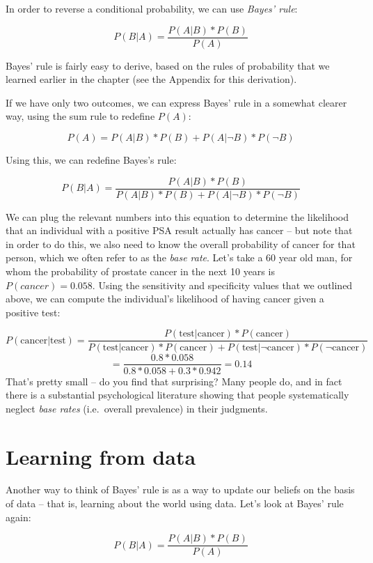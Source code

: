 \documentclass[
  12pt,
]{book}
\begin{document}
In order to reverse a conditional probability, we can use \emph{Bayes' rule}:

\[
P(B|A) = \frac{P(A|B)*P(B)}{P(A)}
\]

Bayes' rule is fairly easy to derive, based on the rules of probability that we learned earlier in the chapter (see the Appendix for this derivation).

If we have only two outcomes, we can express Bayes' rule in a somewhat clearer way, using the sum rule to redefine \(P(A)\):

\[
P(A) = P(A|B)*P(B) + P(A|\neg B)*P(\neg B)
\]

Using this, we can redefine Bayes's rule:

\[
P(B|A) = \frac{P(A|B)*P(B)}{P(A|B)*P(B) + P(A|\neg B)*P(\neg B)}
\]

We can plug the relevant numbers into this equation to determine the likelihood that an individual with a positive PSA result actually has cancer -- but note that in order to do this, we also need to know the overall probability of cancer for that person, which we often refer to as the \emph{base rate}. Let's take a 60 year old man, for whom the probability of prostate cancer in the next 10 years is \(P(cancer)=0.058\). Using the sensitivity and specificity values that we outlined above, we can compute the individual's likelihood of having cancer given a positive test:

\[
P(\text{cancer|test}) = \frac{P(\text{test|cancer})*P(\text{cancer})}{P(\text{test|cancer})*P(\text{cancer}) + P(\text{test|}\neg\text{cancer})*P(\neg\text{cancer})} 
\]
\[
= \frac{0.8*0.058}{0.8*0.058 +0.3*0.942 } = 0.14
\]
That's pretty small -- do you find that surprising? Many people do, and in fact there is a substantial psychological literature showing that people systematically neglect \emph{base rates} (i.e.~overall prevalence) in their judgments.

\hypertarget{learning-from-data-1}{%
\section{Learning from data}\label{learning-from-data-1}}

Another way to think of Bayes' rule is as a way to update our beliefs on the basis of data -- that is, learning about the world using data. Let's look at Bayes' rule again:

\[
P(B|A) =  \frac{P(A|B)*P(B)}{P(A)}
\]
\end{document}
